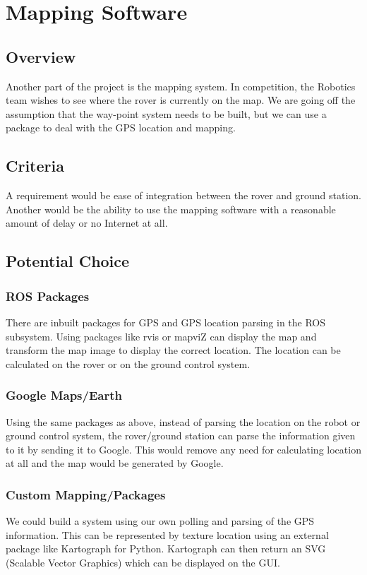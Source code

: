 \documentclass[onecolumn, draftclsnofoot, 10pt, compsoc]{IEEEtran}
\begin{document}
\section{Mapping Software}
\subsection{Overview}
Another part of the project is the mapping system.
In competition, the Robotics team wishes to see where the rover is currently on the map.
We are going off the assumption that the way-point system needs to be built, but we can use a package to deal with the GPS location and mapping.

\subsection{Criteria}
A requirement would be ease of integration between the rover and ground station.
Another would be the ability to use the mapping software with a reasonable amount of delay or no Internet at all.

\subsection{Potential Choice}
\subsubsection{ROS Packages}
There are inbuilt packages for GPS and GPS location parsing in the ROS subsystem.
Using packages like rvis or mapviZ can display the map and transform the map image to display the correct location.
The location can be calculated on the rover or on the ground control system.

\subsubsection{Google Maps/Earth}
Using the same packages as above, instead of parsing the location on the robot or ground control system, the rover/ground station can parse the information given to it by sending it to Google.
This would remove any need for calculating location at all and the map would be generated by Google.

\subsubsection{Custom Mapping/Packages}
We could build a system using our own polling and parsing of the GPS information.
This can be represented by texture location using an external package like Kartograph \cite{karto} for Python.
Kartograph can then return an SVG (Scalable Vector Graphics) which can be displayed on the GUI.
\end{document}
